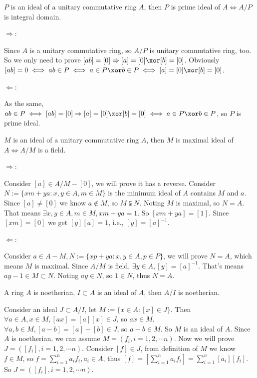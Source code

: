 \documentclass{ctexart}
\newif\ifpreface
\begin{document}
\large
\setlength{\baselineskip}{1.2em}
\ifpreface
	
	\newgeometry{left=2cm,right=2cm,top=2cm,bottom=2cm}
\else
	\maketitle
\fi
\newcommand{\A}{\mathbbm{A}}
\begin{problem}
$P$ is an ideal of a unitary commutative ring $A$, then $P$ is prime ideal of $A\iff A/P$ is integral domain.
\end{problem}
\begin{solution}
	$\Rightarrow $:

	Since $A$ is a unitary commutative ring, so $A/P$ is unitary commutative ring, too. So we only need to prove $[ab]=[0]\Rightarrow [a]=[0]\xor [b]=[0]$.
	Obviously $[ab]=0\iff ab\in P\iff a\in P\xor b\in P\iff [a]=[0]\xor [b]=[0]$.

	$\Leftarrow $:

	As the same, $ab\in P\iff [ab]=[0]\Rightarrow [a]=[0]\xor [b]=[0]\iff a\in P\xor b\in P$, so $P$ is prime ideal.
\end{solution}

\begin{problem}
$M$ is an ideal of a unitary commutative ring $A$, then $M$ is maximal ideal of $A \iff A/M$ is a field.
\end{problem}
\begin{solution}
	$\Rightarrow $:

	Consider $[a]\in A/M\minus [0]$, we will prove it has a reverse.  Consider $N:=\{xm+ya:x,y\in A,m\in M\}$ is the minimum ideal of $A$ contains $M$ and $a$.
	Since $[a]\neq [0]$ we know $a\notin M$, so $M\subsetneqq N$.
	Noting $M$ is maximal, so $N=A$. That means $\exists x,y\in A,m\in M,xm+ya=1$. So $[xm+ya]=[1]$. Since $[xm]=[0]$ we get $[y][a]=1$, i.e., $[y]=[a]^{-1}$.

	$\Leftarrow $:

	Consider $a\in A\minus M, N:=\{xp+ya:x,y\in A,p\in P\}$, we will prove $N=A$, which means $M$ is maximal.
	Since $A/M$ is field, $\exists y\in A, [y]=[a]^{-1}$. That's means $ay-1\in M\subset N$. Noting $ay\in N$, so $1\in N$, thus $N=A$.
\end{solution}

\begin{problem}
A ring $A$ is noetherian, $I\subset A$ is an ideal of $A$, then $A/I$ is noetherian.
\end{problem}
\begin{solution}
	Consider an ideal $J\subset A/I$, let $M:=\{x\in A:[x]\in J\}$. Then $\forall a\in A,x\in M,[ax]=[a][x]\in J$, so $ax\in M$. $\forall a,b\in M,[a-b]=[a]-[b]\in J$, so $a-b\in M$. So $M$ is an ideal of $A$.
	Since $A$ is noetherian, we can assume $M=(f_i,i=1,2,\cdots n)$. Now we will prove $J=([f_i],i=1,2,\cdots n)$.
	Consider $[f]\in J$, from definition of $M$ we know $f\in M$, so $f=\sum_{i=1}^na_if_i,a_i\in A$, thus $[f]=\left[\sum_{i=1}^na_if_i\right]=\sum_{i=1}^n[a_i][f_i]$. So $J=([f_i],i=1,2,\cdots n)$.
\end{solution}
\end{document}
